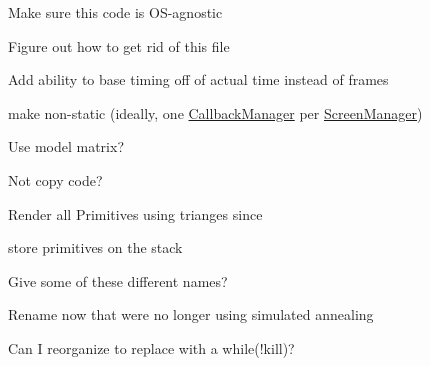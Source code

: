 
\begin{DoxyRefList}
\item[\label{todo__todo000006}%
\Hypertarget{todo__todo000006}%
Namespace \hyperlink{namespacenta}{nta} ]Make sure this code is O\+S-\/agnostic 

Figure out how to get rid of this file  
\item[\label{todo__todo000001}%
\Hypertarget{todo__todo000001}%
Class \hyperlink{classnta_1_1CallbackManager}{nta\+:\+:Callback\+Manager} ]Add ability to base timing off of actual time instead of frames 

make non-\/static (ideally, one \hyperlink{classnta_1_1CallbackManager}{Callback\+Manager} per \hyperlink{classnta_1_1ScreenManager}{Screen\+Manager})  
\item[\label{todo__todo000004}%
\Hypertarget{todo__todo000004}%
Member \hyperlink{structnta_1_1Glyph_a3b2afa4370140736d9d1b28de20d2105}{nta\+:\+:Glyph\+:\+:Glyph} (crvec4 pos\+Rect, crvec4 uv\+Rect, G\+Luint tex, float d, crvec4 col, float angle)]Use model matrix?  
\item[\label{todo__todo000007}%
\Hypertarget{todo__todo000007}%
Member \hyperlink{classnta_1_1IOManager_abbfd9da05b22aa488043a19344d38e0a}{nta\+:\+:I\+O\+Manager\+:\+:read\+File\+To\+Buffer} (crstring file\+Path, std\+::string \&buffer)]Not copy code?  
\item[\label{todo__todo000008}%
\Hypertarget{todo__todo000008}%
Member \hyperlink{classnta_1_1PrimitiveBatch_a8b1bcf740a16d65a79566c0a9aebd117}{nta\+:\+:Primitive\+Batch\+:\+:create\+Render\+Batches} ()]Render all Primitives using trianges since  
\item[\label{todo__todo000003}%
\Hypertarget{todo__todo000003}%
Member \hyperlink{classnta_1_1PrimitiveBatch_a85b1ab0111c7d02d5899f47fe1946c4f}{nta\+:\+:Primitive\+Batch\+:\+:m\+\_\+primitives} ]store primitives on the stack  
\item[\label{todo__todo000005}%
\Hypertarget{todo__todo000005}%
Member \hyperlink{classnta_1_1SpriteBatch_aa703fb92d0bd42865c21fdfb2625660d}{nta\+:\+:Sprite\+Batch\+:\+:add\+Glyph} (crvec4 pos\+Rect, crvec4 uv\+Rect, G\+Luint texture, float depth=N\+T\+A\+\_\+\+D\+E\+F\+A\+U\+L\+T\+\_\+\+D\+E\+P\+TH, crvec4 color=glm\+::vec4(1))]Give some of these different names?  
\item[\label{todo__todo000009}%
\Hypertarget{todo__todo000009}%
Member \hyperlink{classnta_1_1SpriteFont_a9dc96f31efd0830dcb476ea87534e358}{nta\+:\+:Sprite\+Font\+:\+:Sprite\+Font} (crstring font\+Path, unsigned int size)]Rename now that we\textquotesingle{}re no longer using simulated annealing  
\item[\label{todo__todo000010}%
\Hypertarget{todo__todo000010}%
Member \hyperlink{classnta_1_1utils_1_1ThreadPool_a2ca98ba5ed4510e5aac90c0507859b8d}{nta\+:\+:utils\+:\+:Thread\+Pool\+:\+:dispatcher} ()]Can I reorganize to replace with a while(!kill)? 
\end{DoxyRefList}